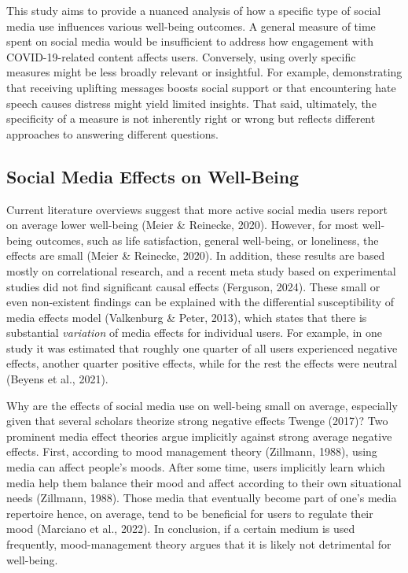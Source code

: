 \documentclass[
  man,mask,floatsintext]{apa7}
\begin{document}
This study aims to provide a nuanced analysis of how a specific type of social media use influences various well-being outcomes.
A general measure of time spent on social media would be insufficient to address how engagement with COVID-19-related content affects users.
Conversely, using overly specific measures might be less broadly relevant or insightful.
For example, demonstrating that receiving uplifting messages boosts social support or that encountering hate speech causes distress might yield limited insights.
That said, ultimately, the specificity of a measure is not inherently right or wrong but reflects different approaches to answering different questions.

\subsection{Social Media Effects on Well-Being}\label{social-media-effects-on-well-being}

Current literature overviews suggest that more active social media users report on average lower well-being (Meier \& Reinecke, 2020).
However, for most well-being outcomes, such as life satisfaction, general well-being, or loneliness, the effects are small (Meier \& Reinecke, 2020).
In addition, these results are based mostly on correlational research, and a recent meta study based on experimental studies did not find significant causal effects (Ferguson, 2024).
These small or even non-existent findings can be explained with the differential susceptibility of media effects model (Valkenburg \& Peter, 2013), which states that there is substantial \emph{variation} of media effects for individual users.
For example, in one study it was estimated that roughly one quarter of all users experienced negative effects, another quarter positive effects, while for the rest the effects were neutral (Beyens et al., 2021).

Why are the effects of social media use on well-being small on average, especially given that several scholars theorize strong negative effects Twenge (2017)?
Two prominent media effect theories argue implicitly against strong average negative effects.
First, according to mood management theory (Zillmann, 1988), using media can affect people's moods.
After some time, users implicitly learn which media help them balance their mood and affect according to their own situational needs (Zillmann, 1988).
Those media that eventually become part of one's media repertoire hence, on average, tend to be beneficial for users to regulate their mood (Marciano et al., 2022).
In conclusion, if a certain medium is used frequently, mood-management theory argues that it is likely not detrimental for well-being.
\end{document}
